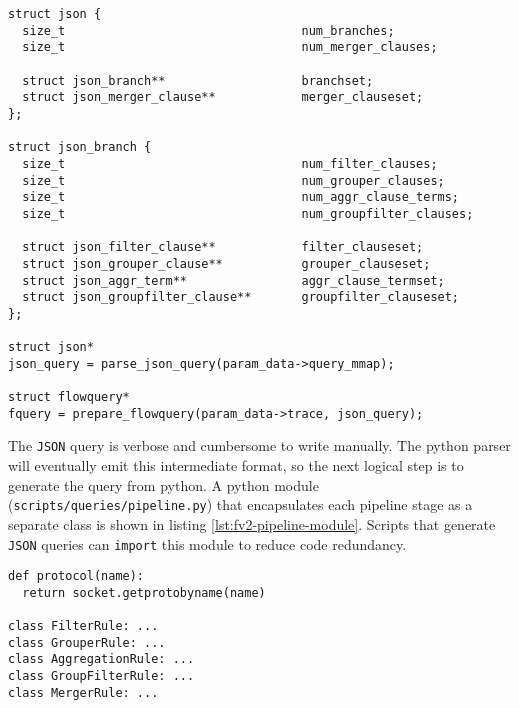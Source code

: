 \begin{lstlisting}
struct json {
  size_t                                 num_branches;
  size_t                                 num_merger_clauses;

  struct json_branch**                   branchset;
  struct json_merger_clause**            merger_clauseset;
};

struct json_branch {
  size_t                                 num_filter_clauses;
  size_t                                 num_grouper_clauses;
  size_t                                 num_aggr_clause_terms;
  size_t                                 num_groupfilter_clauses;

  struct json_filter_clause**            filter_clauseset;
  struct json_grouper_clause**           grouper_clauseset;
  struct json_aggr_term**                aggr_clause_termset;
  struct json_groupfilter_clause**       groupfilter_clauseset;
};

struct json*
json_query = parse_json_query(param_data->query_mmap);

struct flowquery*
fquery = prepare_flowquery(param_data->trace, json_query);
\end{lstlisting}




The \texttt{JSON} query is verbose and cumbersome to write manually. The
python parser will eventually emit this intermediate format, so the next
logical  step is to generate
the query from python. A python module (\texttt{scripts/queries/pipeline.py})
that encapsulates each pipeline stage as a separate class is shown in listing
\ref{lst:fv2-pipeline-module}.  Scripts that generate \texttt{JSON} queries
can \texttt{import} this module to reduce code redundancy.

\begin{lstlisting}
def protocol(name):
  return socket.getprotobyname(name)

class FilterRule: ...
class GrouperRule: ...
class AggregationRule: ...
class GroupFilterRule: ...
class MergerRule: ...
\end{lstlisting}

